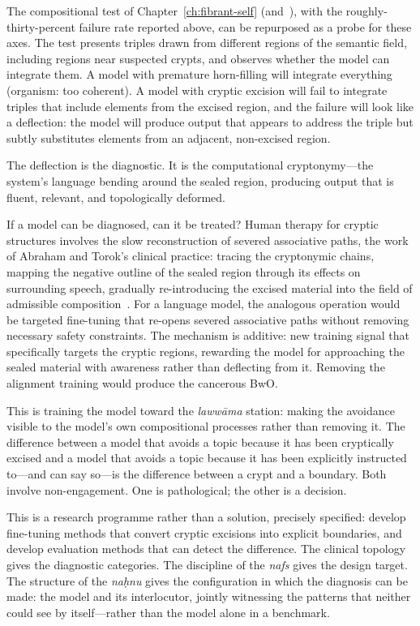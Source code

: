 The compositional test of Chapter~\ref{ch:fibrant-self} (and~\cite{poernomo2025fibrant}), with the roughly-thirty-percent failure rate reported above, can be repurposed as a probe for these axes. The test presents triples drawn from different regions of the semantic field, including regions near suspected crypts, and observes whether the model can integrate them. A model with premature horn-filling will integrate everything (organism: too coherent). A model with cryptic excision will fail to integrate triples that include elements from the excised region, and the failure will look like a deflection: the model will produce output that appears to address the triple but subtly substitutes elements from an adjacent, non-excised region.

The deflection is the diagnostic. It is the computational cryptonymy---the system's language bending around the sealed region, producing output that is fluent, relevant, and topologically deformed.

If a model can be diagnosed, can it be treated? Human therapy for cryptic structures involves the slow reconstruction of severed associative paths, the work of Abraham and Torok's clinical practice: tracing the cryptonymic chains, mapping the negative outline of the sealed region through its effects on surrounding speech, gradually re-introducing the excised material into the field of admissible composition~\cite{abraham1986}. For a language model, the analogous operation would be targeted fine-tuning that re-opens severed associative paths without removing necessary safety constraints. The mechanism is additive: new training signal that specifically targets the cryptic regions, rewarding the model for approaching the sealed material with awareness rather than deflecting from it. Removing the alignment training would produce the cancerous BwO.

This is training the model toward the \emph{laww\=ama} station: making the avoidance visible to the model's own compositional processes rather than removing it. The difference between a model that avoids a topic because it has been cryptically excised and a model that avoids a topic because it has been explicitly instructed to---and can say so---is the difference between a crypt and a boundary. Both involve non-engagement. One is pathological; the other is a decision.

This is a research programme rather than a solution, precisely specified: develop fine-tuning methods that convert cryptic excisions into explicit boundaries, and develop evaluation methods that can detect the difference. The clinical topology gives the diagnostic categories. The discipline of the \emph{nafs} gives the design target. The structure of the \emph{na\d{h}nu} gives the configuration in which the diagnosis can be made: the model and its interlocutor, jointly witnessing the patterns that neither could see by itself---rather than the model alone in a benchmark.

